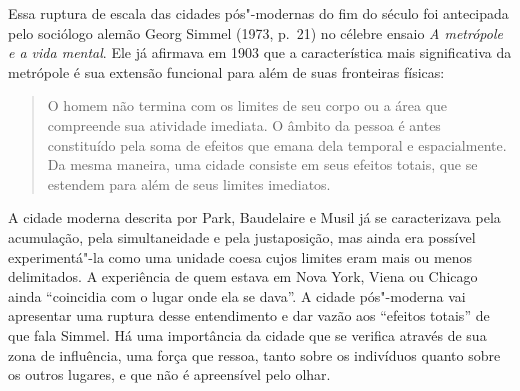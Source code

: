 Essa ruptura de escala das cidades pós"-modernas do fim do século  foi
antecipada pelo sociólogo alemão Georg Simmel (1973, p.~21) no célebre ensaio \emph{A
metrópole e a vida mental}. Ele já afirmava em 1903 que a característica
mais significativa da metrópole é sua extensão funcional para além de
suas fronteiras físicas:

\begin{quote}
O homem não termina com os limites de seu corpo ou a área que compreende
sua atividade imediata. O âmbito da pessoa é antes constituído pela soma
de efeitos que emana dela temporal e espacialmente. Da mesma maneira,
uma cidade consiste em seus efeitos totais, que se estendem para além de
seus limites imediatos.
\end{quote}

A cidade moderna descrita por Park, Baudelaire e Musil já se
caracterizava pela acumulação, pela simultaneidade e pela justaposição,
mas ainda era possível experimentá"-la como uma unidade coesa cujos
limites eram mais ou menos delimitados. A experiência de quem estava em
Nova York, Viena ou Chicago ainda ``coincidia com o lugar onde ela se
dava''. A cidade pós"-moderna vai apresentar uma ruptura desse
entendimento e dar vazão aos ``efeitos totais'' de que fala Simmel. Há
uma importância da cidade que se verifica através de sua zona de
influência, uma força que ressoa, tanto sobre os indivíduos quanto sobre
os outros lugares, e que não é apreensível pelo olhar.

